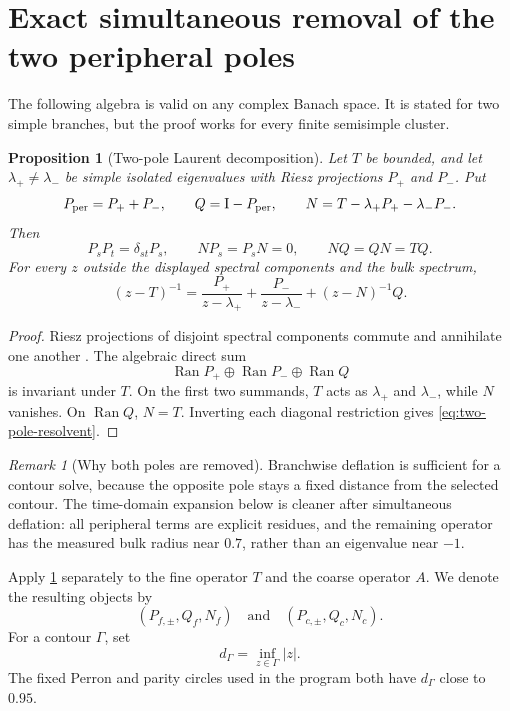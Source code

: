 \documentclass[11pt]{article}
\newtheorem{proposition}[theorem]{Proposition}
\theoremstyle{definition}
\theoremstyle{remark}
\newtheorem{remark}[theorem]{Remark}
\newcommand{\Id}{\mathrm I}
\newcommand{\Ran}{\operatorname{Ran}}
\begin{document}
\section{Exact simultaneous removal of the two peripheral poles}
\label{sec:two-pole}

The following algebra is valid on any complex Banach space.  It is stated
for two simple branches, but the proof works for every finite semisimple
cluster.

\begin{proposition}[Two-pole Laurent decomposition]
\label{prop:two-pole}
Let \(T\) be bounded, and let \(\lambda_+\ne\lambda_-\) be simple isolated
eigenvalues with Riesz projections \(P_+\) and \(P_-\).  Put
\begin{equation}
 P_{\rm per}=P_++P_-,
 \qquad
 Q=\Id-P_{\rm per},
 \qquad
 N=T-\lambda_+P_+-\lambda_-P_-.
 \label{eq:N-def}
\end{equation}
Then
\[
 P_sP_t=\delta_{st}P_s,
 \qquad
 N P_s=P_sN=0,
 \qquad
 NQ=QN=TQ.
\]
For every \(z\) outside the displayed spectral components and the bulk
spectrum,
\begin{equation}
 \boxed{
 (z-T)^{-1}
 =
 \frac{P_+}{z-\lambda_+}
 +\frac{P_-}{z-\lambda_-}
 +(z-N)^{-1}Q.}
 \label{eq:two-pole-resolvent}
\end{equation}
\end{proposition}

\begin{proof}
Riesz projections of disjoint spectral components commute and annihilate
one another \citep{Kato1995}.  The algebraic direct sum
\[
 \Ran P_+\oplus\Ran P_-\oplus\Ran Q
\]
is invariant under \(T\).  On the first two summands, \(T\) acts as
\(\lambda_+\) and \(\lambda_-\), while \(N\) vanishes.  On \(\Ran Q\),
\(N=T\).  Inverting each diagonal restriction gives
\eqref{eq:two-pole-resolvent}.
\end{proof}

\begin{remark}[Why both poles are removed]
Branchwise deflation is sufficient for a contour solve, because the opposite
pole stays a fixed distance from the selected contour.  The time-domain
expansion below is cleaner after simultaneous deflation: all peripheral
terms are explicit residues, and the remaining operator has the measured
bulk radius near \(0.7\), rather than an eigenvalue near \(-1\).
\end{remark}

Apply \cref{prop:two-pole} separately to the fine operator \(T\) and the
coarse operator \(A\).  We denote the resulting objects by
\[
 (P_{f,\pm},Q_f,N_f)
 \quad\text{and}\quad
 (P_{c,\pm},Q_c,N_c).
\]
For a contour \(\Gamma\), set
\begin{equation}
 d_\Gamma=\inf_{z\in\Gamma}|z|.
 \label{eq:dGamma}
\end{equation}
The fixed Perron and parity circles used in the program both have
\(d_\Gamma\) close to \(0.95\).
\end{document}
